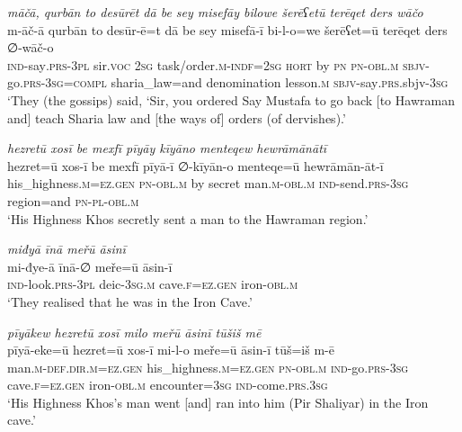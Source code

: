 \ea \label{ŽP.126}
\textit{māčā, qurbān to desūrēt dā be sey misefāy bilowe šerēʕetū terēqet ders wāčo} \\ 
\gll m-āč-ā qurbān to desūr-ē=t dā be sey misefā-ī bi-l-o=we šerēʕet=ū terēqet ders ∅-wāč-o \\ 
 \textsc{ind-}say\textsc{.prs}\textsc{-3pl} sir.\textsc{voc} \textsc{2sg} task/order\textsc{.m}\textsc{-indf}\textsc{=\textsc{2sg}} \textsc{hort} by \textsc{pn} \textsc{pn}\textsc{-obl}\textsc{.m} \textsc{sbjv-}go\textsc{.prs}\textsc{-3sg}\textsc{=compl} sharia\_law=and denomination lesson\textsc{.m} \textsc{sbjv-}say\textsc{.prs}.sbjv\textsc{-3sg} \\ 
\glt `They (the gossips) said, ‘Sir, you ordered Say Mustafa to go back [to Hawraman and] teach Sharia law and [the ways of] orders (of dervishes).'
\z 
 
\ea \label{ŽP.129}
\textit{hezretū xosī be mexfī pīyāy kīyāno menteqew hewrāmānātī} \\ 
\gll hezret=ū xos-ī be mexfī pīyā-ī ∅-kīyān-o menteqe=ū hewrāmān-āt-ī \\ 
 his\_highness\textsc{.m}\textsc{\textsc{=ez.gen}} \textsc{pn}\textsc{-obl}\textsc{.m} by secret man\textsc{.m}\textsc{-obl}\textsc{.m} \textsc{ind-}send\textsc{.prs}\textsc{-3sg} region=and \textsc{pn}\textsc{\textsc{-pl}}\textsc{-obl}\textsc{.m} \\ 
\glt `His Highness Khos secretly sent a man to the Hawraman region.'
\z 
 
\ea \label{ŽP.131}
\textit{miđyā īnā meřū āsinī} \\ 
\gll mi-đye-ā īnā-∅ meře=ū āsin-ī \\ 
 \textsc{ind-}look\textsc{.prs}\textsc{-3pl} deic\textsc{-3sg}\textsc{.m} cave\textsc{.f}\textsc{\textsc{=ez.gen}} iron\textsc{-obl}\textsc{.m} \\ 
\glt `They realised that he was in the Iron Cave.'
\z 
 
\ea \label{ŽP.132}
\textit{pīyākew hezretū xosī milo meřū āsinī tūšiš mē} \\ 
\gll pīyā-eke=ū hezret=ū xos-ī mi-l-o meře=ū āsin-ī tūš=iš m-ē \\ 
 man\textsc{.m}\textsc{-def}\textsc{.dir}\textsc{.m}\textsc{\textsc{=ez.gen}} his\_highness\textsc{.m}\textsc{\textsc{=ez.gen}} \textsc{pn}\textsc{-obl}\textsc{.m} \textsc{ind-}go\textsc{.prs}\textsc{-3sg} cave\textsc{.f}\textsc{\textsc{=ez.gen}} iron\textsc{-obl}\textsc{.m} encounter\textsc{=3sg} \textsc{ind-}come\textsc{.prs}\textsc{.3sg} \\ 
\glt `His Highness Khos’s man went [and] ran into him (Pir Shaliyar) in the Iron cave.'
\z 
 
